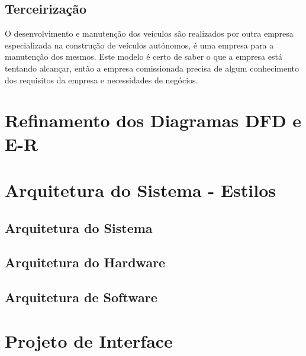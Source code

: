 \subsection{Terceirização}
O desenvolvimento e manutenção dos veículos são realizados por outra empresa especializada na construção de veículos autónomos, é uma empresa para a manutenção dos mesmos. Este modelo é certo de saber o que a empresa está tentando alcançar, então a empresa comissionada precisa de algum conhecimento dos requisitos da empresa e necessidades de negócios.



\section{Refinamento dos Diagramas DFD e E-R}


\section{Arquitetura do Sistema - Estilos}



\subsection{Arquitetura do Sistema}



\subsection{Arquitetura do Hardware}


\subsection{Arquitetura de Software}


\section{Projeto de Interface}
